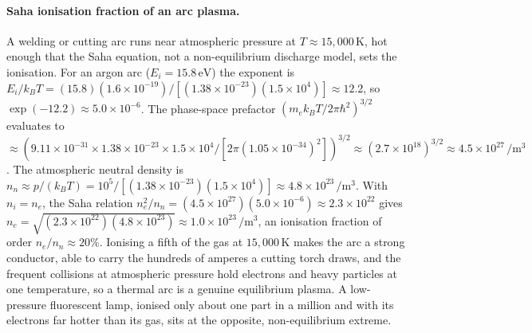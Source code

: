 \paragraph{Saha ionisation fraction of an arc plasma.}
A welding or cutting arc runs near atmospheric pressure at $T \approx
15{,}000\,\si{\kelvin}$, hot enough that the Saha equation, not a
non-equilibrium discharge model, sets the ionisation. For an argon arc
($E_{i} = 15.8\,\si{\electronvolt}$) the exponent is $E_{i}/k_{B}T =
(15.8)(1.6\times 10^{-19})/[(1.38\times 10^{-23})(1.5\times 10^{4})] \approx
12.2$, so $\exp(-12.2) \approx 5.0\times 10^{-6}$. The phase-space prefactor
$(m_{e}k_{B}T/2\pi\hbar^{2})^{3/2}$ evaluates to $\approx (9.11\times
10^{-31}\times 1.38\times 10^{-23}\times 1.5\times 10^{4}/[2\pi(1.05\times
10^{-34})^{2}])^{3/2} \approx (2.7\times 10^{18})^{3/2} \approx 4.5\times
10^{27}\,\si{\per\meter\cubed}$. The atmospheric neutral density is $n_{n}
\approx p/(k_{B}T) = 10^{5}/[(1.38\times 10^{-23})(1.5\times 10^{4})]
\approx 4.8\times 10^{23}\,\si{\per\meter\cubed}$. With $n_{i} = n_{e}$, the
Saha relation $n_{e}^{2}/n_{n} = (4.5\times 10^{27})(5.0\times 10^{-6})
\approx 2.3\times 10^{22}$ gives $n_{e} = \sqrt{(2.3\times 10^{22})(4.8\times
10^{23})} \approx 1.0\times 10^{23}\,\si{\per\meter\cubed}$, an ionisation
fraction of order $n_{e}/n_{n}\approx 20\%$. Ionising a fifth of the gas at
$15{,}000\,\si{\kelvin}$ makes the arc a strong conductor, able to
carry the hundreds of amperes a cutting torch draws, and the frequent
collisions at atmospheric pressure hold electrons and heavy particles at one
temperature, so a thermal arc is a genuine equilibrium plasma. A low-pressure
fluorescent lamp, ionised only about one part in a million and with its
electrons far hotter than its gas, sits at the opposite, non-equilibrium
extreme.

